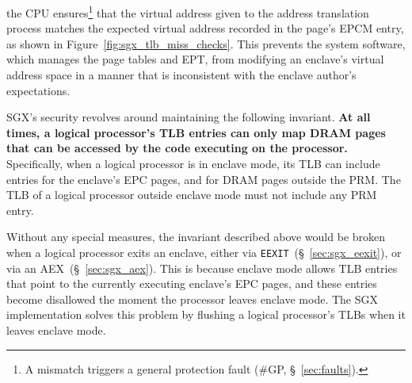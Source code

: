 the CPU ensures\footnote{A mismatch triggers a general
protection fault (\#GP, \S~\ref{sec:faults}).} that the virtual address given
to the address translation process matches the expected virtual address
recorded in the page's EPCM entry, as shown in
Figure~\ref{fig:sgx_tlb_miss_checks}. This prevents the system software, which
manages the page tables and EPT, from modifying an enclave's virtual address
space in a manner that is inconsistent with the enclave author's expectations.


SGX's security revolves around maintaining the following
invariant. \textbf{At all times, a logical processor's TLB
entries can only map DRAM pages that can be accessed by the code executing on
the processor.} Specifically, when a logical processor is in enclave mode, its
TLB can include entries for the enclave's EPC pages, and for DRAM pages outside
the PRM. The TLB of a logical processor outside enclave mode must not include
any PRM entry.

Without any special measures, the invariant described above would be broken
when a logical processor exits an enclave, either via
\texttt{EEXIT}~(\S~\ref{sec:sgx_eexit}), or via an AEX~(\S~\ref{sec:sgx_aex}).
This is because enclave mode allows TLB entries that point to the currently
executing enclave's EPC pages, and these entries become disallowed the moment
the processor leaves enclave mode. The SGX implementation solves this problem
by flushing a logical processor's TLBs when it leaves enclave mode.

